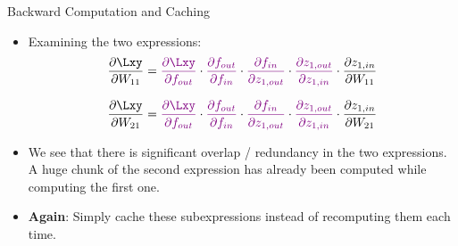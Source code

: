 \begin{frame} {Backward Computation and Caching}
\begin{itemize}
\item Examining the two expressions:
$$\frac{\partial \Lxy}{\partial W_{11}} = 
\textcolor{violet}{\frac{\partial \Lxy}{\partial f_{out}}} \cdot  \textcolor{violet}{\frac{\partial f_{out}}{\partial f_{in}}} \cdot  \textcolor{violet}{\frac{\partial f_{in}}{\partial z_{1,out}}} \cdot  \textcolor{violet}{\frac{\partial z_{1,out}}{\partial z_{1,in}}} \cdot  \textcolor{black}{\frac{\partial z_{1,in}}{\partial W_{11}}}$$

$$\frac{\partial \Lxy}{\partial W_{21}} =     
\textcolor{violet}{\frac{\partial \Lxy}{\partial f_{out}}} \cdot  \textcolor{violet}{\frac{\partial f_{out}}{\partial f_{in}}} \cdot  \textcolor{violet}{\frac{\partial f_{in}}{\partial z_{1,out}}} \cdot  \textcolor{violet}{\frac{\partial z_{1,out}}{\partial z_{1,in}}} \cdot  \textcolor{black}{\frac{\partial z_{1,in}}{\partial W_{21}}}$$

\item We see that there is significant overlap / redundancy in the two expressions. A huge chunk of the second expression has already been computed while computing the first one.
\item \textbf{Again}: Simply cache these subexpressions instead of recomputing them each time.
\end{itemize}
\end{frame}

